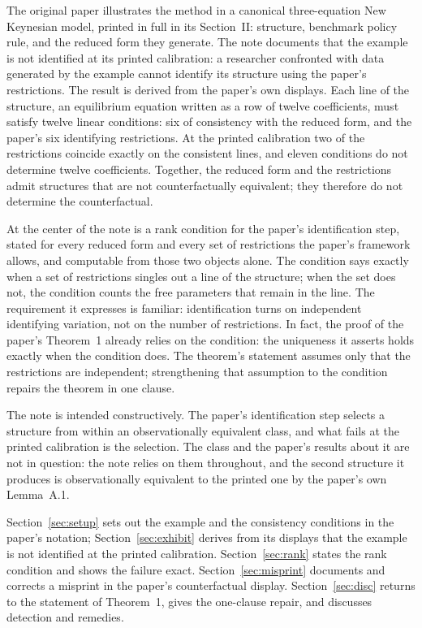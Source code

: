 \documentclass[11pt]{article}
\theoremstyle{remark}
\begin{document}
The original paper illustrates the method in a canonical three-equation New Keynesian model, printed in full in its Section~II: structure, benchmark policy rule, and the reduced form they generate. The note documents that the example is not identified at its printed calibration: a researcher confronted with data generated by the example cannot identify its structure using the paper's restrictions. The result is derived from the paper's own displays. Each line of the structure, an equilibrium equation written as a row of twelve coefficients, must satisfy twelve linear conditions: six of consistency with the reduced form, and the paper's six identifying restrictions. At the printed calibration two of the restrictions coincide exactly on the consistent lines, and eleven conditions do not determine twelve coefficients. Together, the reduced form and the restrictions admit structures that are not counterfactually equivalent; they therefore do not determine the counterfactual.

At the center of the note is a rank condition for the paper's identification step, stated for every reduced form and every set of restrictions the paper's framework allows, and computable from those two objects alone. The condition says exactly when a set of restrictions singles out a line of the structure; when the set does not, the condition counts the free parameters that remain in the line. The requirement it expresses is familiar: identification turns on independent identifying variation, not on the number of restrictions. In fact, the proof of the paper's Theorem~1 already relies on the condition: the uniqueness it asserts holds exactly when the condition does. The theorem's statement assumes only that the restrictions are independent; strengthening that assumption to the condition repairs the theorem in one clause.

The note is intended constructively. The paper's identification step selects a structure from within an observationally equivalent class, and what fails at the printed calibration is the selection. The class and the paper's results about it are not in question: the note relies on them throughout, and the second structure it produces is observationally equivalent to the printed one by the paper's own Lemma~A.1.

Section~\ref{sec:setup} sets out the example and the consistency conditions in the paper's notation; Section~\ref{sec:exhibit} derives from its displays that the example is not identified at the printed calibration. Section~\ref{sec:rank} states the rank condition and shows the failure exact. Section~\ref{sec:misprint} documents and corrects a misprint in the paper's counterfactual display. Section~\ref{sec:disc} returns to the statement of Theorem~1, gives the one-clause repair, and discusses detection and remedies.
\end{document}
